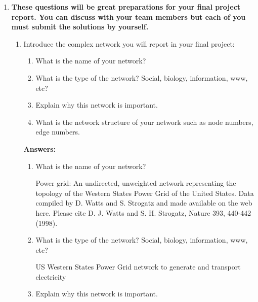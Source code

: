 \documentclass{amsart}
\theoremstyle{definition}
\theoremstyle{remark}
\numberwithin{equation}{section}
\begin{document}
\clearpage
\begin{enumerate}

\item {\bf These questions will be great preparations for your final project report. You can discuss with your team members but each of you must submit the solutions by yourself.}
\begin{enumerate}
\item Introduce the complex network you will report in your final project:
\begin{enumerate}
\item What is the name of your network?
\item What is the type of the network? Social, biology, information, www, etc?
\item Explain why this network is important.
\item What is the network structure of your network such as node numbers, edge numbers. 
\end{enumerate}

\vspace{1cm}

\textbf{Answers:}

\begin{enumerate}
\item What is the name of your network? \vspace{0.2cm}

Power grid: An undirected, unweighted network representing the topology of the Western States Power Grid of the United States. Data compiled by D. Watts and S. Strogatz and made available on the web here. Please cite D. J. Watts and S. H. Strogatz, Nature 393, 440-442 (1998). \vspace{0.2cm}

\item What is the type of the network? Social, biology, information, www, etc? \vspace{0.2cm}

US Western States Power Grid network to generate and transport electricity \vspace{0.2cm}

\item Explain why this network is important. \vspace{0.2cm}


\end{enumerate}
\end{enumerate}
\end{enumerate}
\end{document}
